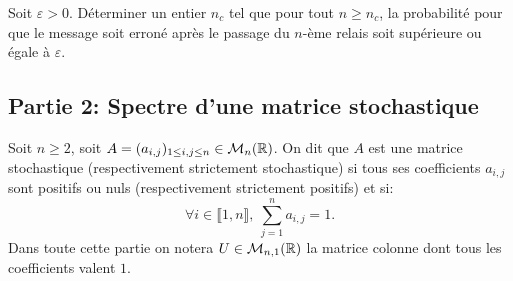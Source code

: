 \begin{enumerate}
Soit $\varepsilon >0$. Déterminer un entier $n_{c}$ tel que pour tout $n\geq n_{c}$, la probabilité pour que le message soit erroné après le passage du $n$-ème relais soit supérieure ou égale à $\varepsilon$. 

\end{enumerate}




\subsection*{Partie 2: Spectre d'une matrice stochastique}


Soit $n\geq 2$, soit $A=(a_{i,j})_{1\leq i,j\leq n}\in \mathcal{M}_{n}(\mathbb{R})$. On dit que $A$ est une matrice stochastique (respectivement strictement stochastique) si tous ses coefficients $a_{i,j}$ sont positifs ou nuls (respectivement strictement positifs) et si:
\[\forall i\in \llbracket 1, n\rrbracket ,\ \sum_{j=1}^{n}a_{i,j} = 1.\]
Dans toute cette partie on notera $U\in \mathcal{M}_{n,1}(\mathbb{R})$ la matrice colonne dont tous les coefficients valent $1$.



